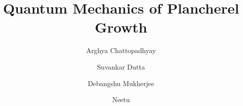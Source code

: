 \documentclass[final,3p,12pt,times]{elsarticle}
\numberwithin{equation}{section}
\begin{document}
	
	\begin{frontmatter}
		
		
		
		\title{Quantum Mechanics of Plancherel Growth}
		
		
		
		\author[1,2]{Arghya Chattopadhyay}
		\author[3]{Suvankar Dutta}
		\author[3,4]{Debangshu Mukherjee}
		\author[3]{Neetu}
		
		
		\address[1]{Institute of Mathematical Sciences, Homi Bhaba National Institute (HBNI),\\ IV Cross Road, Taramani, Chennai 600113, India}
		\address[2]{National Institute for Theoretical Physics,\\School of Physics and Mandelstam Institute for Theoretical Physics,\\University of the Witwatersrand, Wits, 2050, South Africa.}
		\address[3]{Department of Physics, Indian Institute of Science Education and Research  Bhopal,\\ Bhopal bypass, Bhopal 462066, India}
		\address[4]{School of Physics, Indian Institute of Science Education and Research Thiruvananthapuram,\\ Vithura 695551, Kerala, India.}
        

	
		

\end{frontmatter}
\end{document}
